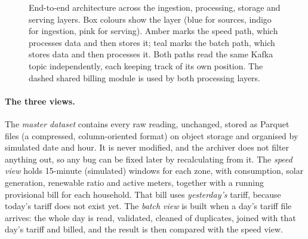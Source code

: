 \documentclass[11pt,a4paper]{article}
\begin{document}
\begin{figure}[H]
{}
\caption{End-to-end architecture across the ingestion, processing, storage and serving
layers. Box colours show the layer (blue for sources, indigo for ingestion, pink for
serving). Amber marks the speed path, which processes data and then stores it; teal marks
the batch path, which stores data and then processes it. Both paths read the same Kafka
topic independently, each keeping track of its own position. The dashed shared billing
module is used by both processing layers.}
\label{fig:lambda}
\end{figure}

\paragraph{The three views.} The \emph{master dataset} contains every raw reading,
unchanged, stored as Parquet files (a compressed, column-oriented format) on object storage
and organised by simulated date and hour. It is never modified, and the archiver does not
filter anything out, so any bug can be fixed later by recalculating from it. The \emph{speed
view} holds 15-minute (simulated) windows for each zone, with consumption, solar generation,
renewable ratio and active meters, together with a running provisional bill for each
household. That bill uses \emph{yesterday's} tariff, because today's tariff does not exist
yet. The \emph{batch view} is built when a day's tariff file arrives: the whole day is read,
validated, cleaned of duplicates, joined with that day's tariff and billed, and the result
is then compared with the speed view.
\end{document}
